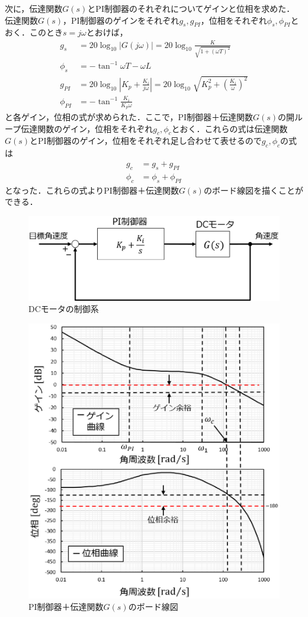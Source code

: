 次に，伝達関数$G(s)$とPI制御器のそれぞれについてゲインと位相を求めた．
伝達関数$G(s)$，PI制御器のゲインをそれぞれ$g_{s},g_{PI}$，位相をそれぞれ$\phi_{s},\phi_{PI}$とおく．このとき$s=j\omega$とおけば，
\begin{align}
 g_{s}&=20\log_{10}{|G(j\omega)|}=20\log_{10}{\frac{K}{\sqrt{1+(\omega T)^{2}}}} \\
 \phi_{s}&=-\tan^{-1}{\omega T}-\omega L \\
 g_{PI}&=20\log_{10}{|K_{p}+\frac{K_{i}}{j\omega}|}=20\log_{10}{\sqrt{K_{p}^{2}+(\frac{K_{i}}{\omega})^{2}}} \\
 \phi_{PI}&=-\tan^{-1}{\frac{K_{i}}{K_{p}\omega}}
\end{align}
と各ゲイン，位相の式が求められた．ここで，PI制御器＋伝達関数$G(s)$の開ループ伝達関数のゲイン，位相をそれぞれ$g_{c},\phi_{c}$とおく．これらの式は伝達関数$G(s)$とPI制御器のゲイン，位相をそれぞれ足し合わせて表せるので$g_{c},\phi_{c}$の式は
\begin{align}
 g_{c}&=g_{s}+g_{PI}\\
 \phi_{c}&=\phi_{s}+\phi_{PI}
\end{align}
となった．これらの式よりPI制御器＋伝達関数$G(s)$のボード線図を描くことができる．

\begin{figure}[htb]
  \centering
    \includegraphics[width=0.7\hsize]{picture/eps/pi_control.eps}
  \caption{DCモータの制御系}
  \label{fig::pi_control}
  
\end{figure}

\begin{figure}[htb]
  \centering
    \includegraphics[width=0.6\hsize]{picture/eps/pi_board.eps}
  \caption{PI制御器＋伝達関数$G(s)$のボード線図}
  \label{fig::pi_board}
  
\end{figure}

